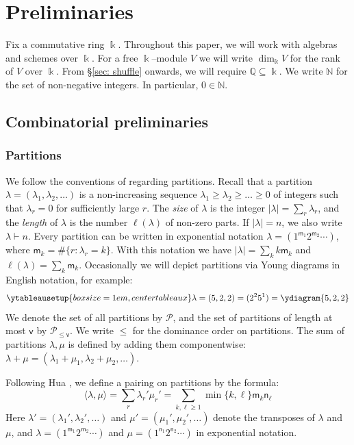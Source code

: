 \documentclass[11pt,reqno]{amsart}
\numberwithin{equation}{section}
\theoremstyle{definition}
\newcommand{\cP}{\mathcal{P}}
\newcommand{\NN}{\mathbb{N}}
\newcommand{\QQ}{\mathbb{Q}}
\newcommand{\kk}{\Bbbk}
\newcommand{\sv}{\mathsf{v}}
\newcommand{\sm}{\mathsf{m}}
\newcommand{\sn}{\mathsf{n}}
\newcommand{\Partitions}{\cP}
\newcommand{\la}{\lambda}
\begin{document}
\section{Preliminaries}
\label{sec: prelim}
Fix a commutative ring $\kk$. Throughout this paper, we will work with algebras and schemes over $\kk$. For a free $\kk$--module $V $ we will write $\dim_\kk V$ for the rank of $V$ over $\kk$. From \S \ref{sec: shuffle} onwards, we will require $\QQ \subseteq \kk$.
We write $\NN$ for the set of non-negative integers. In particular, $0 \in \NN$.

\subsection{Combinatorial preliminaries}
\subsubsection{Partitions}
\label{sssec:Partitions}

We follow the conventions of \cite[I.1]{Macdonald} regarding partitions.  Recall that a partition $\lambda = (\lambda_1, \lambda_2, \ldots)$ is a  non-increasing sequence $\lambda_1\geq \lambda_2 \geq \ldots \geq 0$ of integers such that $\lambda_r=0$ for sufficiently large $r$.  The \emph{size}  of $\lambda$ is the integer $|\lambda| = \sum_r \lambda_r$, and the \emph{length} of $\lambda$ is the number $\ell(\lambda)$ of non-zero parts.  If $|\lambda| = n$, we also write $\lambda \vdash n$. Every partition can be written in exponential notation $\lambda = (1^{\sm_1} 2^{\sm_2} \cdots)$, where $\sm_k = \#\{ r : \lambda_r = k\}$.  With this notation we have $|\lambda| = \sum_k k \sm_k$ and $\ell(\lambda) = \sum_k \sm_k$.
Occasionally we will depict partitions via Young diagrams in English notation, for example:
$$
    \ytableausetup{boxsize=1em,centertableaux}
    \lambda = (5,2,2) = (2^2 5^1) = \ydiagram{5,2,2}
$$
We denote the set of all partitions by $\Partitions$, and the set of partitions of length at most $\sv$ by $\Partitions_{\leq \sv}$. We write $\leq$ for the {dominance order} on partitions.  The sum of partitions $\la, \mu$ is defined by adding them componentwise: $\la+\mu = (\la_1+\mu_1, \la_2 +\mu_2, \ldots)$.


Following Hua \cite[Lemma 3.1]{Hua}, we define a pairing on partitions by the formula:
\begin{equation}
    \label{eq: Hua pairing}
    \langle \lambda, \mu \rangle  = \sum_r \lambda_r' \mu_r ' = \sum_{k, \ell \geq 1} \min\{k, \ell\} \sm_k \sn_\ell
    \end{equation}   
Here $\lambda' = (\lambda_1',\lambda_2',\ldots)$ and $ \mu' = (\mu_1',\mu_2',\ldots)$ denote the transposes of $\lambda$ and $\mu$, and $\lambda = (1^{\sm_1} 2^{\sm_2}\cdots) $ and $\mu = (1^{\sn_1} 2^{\sn_2}\cdots)$ in exponential notation.
\end{document}
